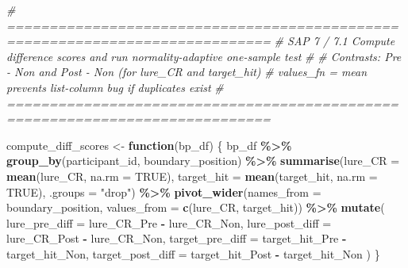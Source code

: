 \documentclass[
]{article}
\newenvironment{Shaded}{\begin{snugshade}}{\end{snugshade}}
\newcommand{\AttributeTok}[1]{\textcolor[rgb]{0.13,0.29,0.53}{#1}}
\newcommand{\CommentTok}[1]{\textcolor[rgb]{0.56,0.35,0.01}{\textit{#1}}}
\newcommand{\ConstantTok}[1]{\textcolor[rgb]{0.56,0.35,0.01}{#1}}
\newcommand{\ControlFlowTok}[1]{\textcolor[rgb]{0.13,0.29,0.53}{\textbf{#1}}}
\newcommand{\FunctionTok}[1]{\textcolor[rgb]{0.13,0.29,0.53}{\textbf{#1}}}
\newcommand{\NormalTok}[1]{#1}
\newcommand{\OtherTok}[1]{\textcolor[rgb]{0.56,0.35,0.01}{#1}}
\newcommand{\SpecialCharTok}[1]{\textcolor[rgb]{0.81,0.36,0.00}{\textbf{#1}}}
\newcommand{\StringTok}[1]{\textcolor[rgb]{0.31,0.60,0.02}{#1}}
\begin{document}
\begin{Shaded}
\begin{Highlighting}[]
\CommentTok{\# =============================================================================}
\CommentTok{\# SAP 7 / 7.1  Compute difference scores and run normality{-}adaptive one{-}sample test}
\CommentTok{\#}
\CommentTok{\# Contrasts: Pre {-} Non and Post {-} Non (for lure\_CR and target\_hit)}
\CommentTok{\# values\_fn = mean prevents list{-}column bug if duplicates exist}
\CommentTok{\# =============================================================================}

\NormalTok{compute\_diff\_scores }\OtherTok{\textless{}{-}} \ControlFlowTok{function}\NormalTok{(bp\_df) \{}
\NormalTok{  bp\_df }\SpecialCharTok{\%\textgreater{}\%}
    \FunctionTok{group\_by}\NormalTok{(participant\_id, boundary\_position) }\SpecialCharTok{\%\textgreater{}\%}
    \FunctionTok{summarise}\NormalTok{(}\AttributeTok{lure\_CR    =} \FunctionTok{mean}\NormalTok{(lure\_CR,    }\AttributeTok{na.rm =} \ConstantTok{TRUE}\NormalTok{),}
              \AttributeTok{target\_hit =} \FunctionTok{mean}\NormalTok{(target\_hit, }\AttributeTok{na.rm =} \ConstantTok{TRUE}\NormalTok{),}
              \AttributeTok{.groups    =} \StringTok{"drop"}\NormalTok{) }\SpecialCharTok{\%\textgreater{}\%}
    \FunctionTok{pivot\_wider}\NormalTok{(}\AttributeTok{names\_from  =}\NormalTok{ boundary\_position,}
                \AttributeTok{values\_from =} \FunctionTok{c}\NormalTok{(lure\_CR, target\_hit)) }\SpecialCharTok{\%\textgreater{}\%}
    \FunctionTok{mutate}\NormalTok{(}
      \AttributeTok{lure\_pre\_diff    =}\NormalTok{ lure\_CR\_Pre    }\SpecialCharTok{{-}}\NormalTok{ lure\_CR\_Non,}
      \AttributeTok{lure\_post\_diff   =}\NormalTok{ lure\_CR\_Post   }\SpecialCharTok{{-}}\NormalTok{ lure\_CR\_Non,}
      \AttributeTok{target\_pre\_diff  =}\NormalTok{ target\_hit\_Pre  }\SpecialCharTok{{-}}\NormalTok{ target\_hit\_Non,}
      \AttributeTok{target\_post\_diff =}\NormalTok{ target\_hit\_Post }\SpecialCharTok{{-}}\NormalTok{ target\_hit\_Non}
\NormalTok{    )}
\NormalTok{\}}


\end{Highlighting}
\end{Shaded}
\end{document}
